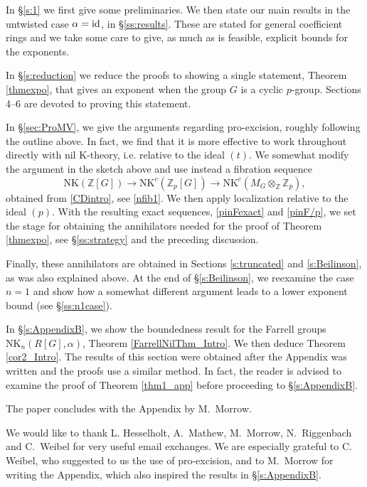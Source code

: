 \documentclass[reqno,11pt,letterpaper]{amsart}
\theoremstyle{plain}
\numberwithin{equation}{subsection}
\theoremstyle{remark}
\theoremstyle{plain}
\theoremstyle{definition}\newtheorem*{notation}{Notation}
\newcommand{\RK}{\mathrm{K}}
\newcommand{\RNK}{\mathrm{NK}}
\newcommand{\NK}{\mathrm{NK}}
\newcommand{\BZ}{\mathbb{Z}}
\begin{document}
In \S \ref{s:1} we first give some preliminaries.  
 We then state our main results in the untwisted case $\alpha={\rm id}$, in \S \ref{ss:results}. These are stated for   general coefficient rings and we take some care 
 to give, as much as is feasible, explicit bounds for the exponents.  
 

In \S \ref{s:reduction} we reduce the proofs to showing a single statement, Theorem \ref{thmexpo},  that gives an exponent when the group $G$ is a cyclic $p$-group. Sections 4--6 are devoted to proving this statement. 

In \S \ref{sec:ProMV},
we give the arguments regarding pro-excision, roughly following the outline above. In fact, we find that it is more effective to work throughout directly with nil $\RK$-theory, i.e. relative to the ideal $(t)$. We somewhat modify the argument in the sketch above and use instead a fibration sequence
\[
\RNK(\BZ[G])\to \RNK^c(\BZ_p[G])\to \RNK^c(M_G\otimes_\BZ\BZ_p),
\]
obtained from \eqref{CDintro}, see \eqref{nfib1}. We then apply localization relative to the ideal $(p)$.
With the resulting exact sequences, 
\eqref{pinFexact} and  \eqref{pinF/p}, we set the stage for obtaining the annihilators needed for the proof of Theorem \ref{thmexpo}, see \S \ref{ss:strategy} and the preceding discussion. 
 

Finally, these annihilators are obtained in  Sections \ref{s:truncated}  and \ref{s:Beilinson}, as was also explained above. At the end of \S \ref{s:Beilinson},
we reexamine the case $n=1$ and show how a somewhat different argument leads to a lower exponent bound (see \S \ref{ss:n1case}).

In \S \ref{s:AppendixB}, we show the boundedness result  for the Farrell  groups $\NK_n(R[G],\alpha)$, Theorem \ref{FarrellNilThm_Intro}. We then deduce Theorem \ref{cor2_Intro}. The results of this section were obtained after the Appendix was written and the proofs use a similar method. In fact, 
the reader is advised to examine the proof of Theorem \ref{thm1_app} before proceeding to \S \ref{s:AppendixB}. 



The paper concludes with the Appendix by M.~Morrow.

 
\smallskip 

 We would like to thank L. Hesselholt, A.~Mathew,  M.~Morrow, N.~Riggenbach and C.~Weibel for very useful email exchanges. 
We are especially grateful   to  C. Weibel, who suggested to us the use of pro-excision,  and to M.~Morrow for writing the Appendix, which also inspired the results in \S  \ref{s:AppendixB}.
\end{document}
